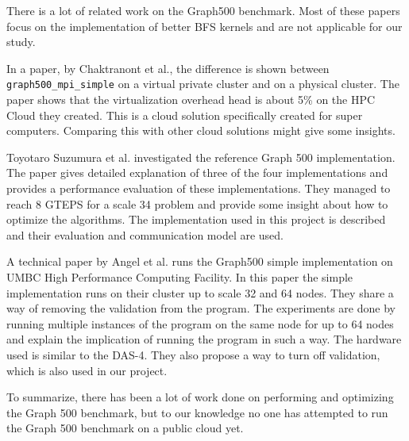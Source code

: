 There is a lot of related work on the Graph500 benchmark. Most of these papers focus on the implementation of better BFS kernels and are not applicable for our study.

In a paper, by Chaktranont et al.\cite{chakthranont2014exploring}, the difference is shown between \texttt{graph500\_mpi\_simple} on a virtual private cluster and on a physical cluster. The paper shows that the  virtualization overhead head is about 5\% on the HPC Cloud they created. This is a cloud solution specifically created for super computers. Comparing this with other cloud solutions might give some insights.

Toyotaro Suzumura et al. \cite{suzumura2011performance} investigated the reference Graph 500 implementation. The paper gives detailed explanation of three of the four implementations and provides a performance evaluation of these implementations. They managed to reach 8 GTEPS for a scale 34 problem and provide some insight about how to optimize the algorithms. The implementation used in this project is described and their evaluation and communication model are used.

A technical paper by Angel et al.\cite{angel2012graph} runs the Graph500 simple implementation on UMBC High Performance Computing Facility. In this paper the simple implementation runs on their cluster up to scale 32 and 64 nodes. They share a way of removing the validation from the program. The experiments are done by running multiple instances of the program on the same node for up to 64 nodes and explain the implication of running the program in such a way. The hardware used is similar to the DAS-4. They also propose a way to turn off validation, which is also used in our project.

To summarize, there has been a lot of work done on performing and optimizing the Graph 500 benchmark, but to our knowledge no one has attempted to run the Graph 500 benchmark on a public cloud yet.